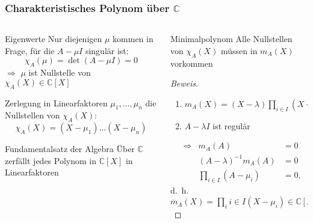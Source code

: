 %
%
%
\begin{frame}[t]
\setlength{\abovedisplayskip}{5pt}
\setlength{\belowdisplayskip}{5pt}
\frametitle{Charakteristisches Polynom über $\mathbb{C}$}
\vspace{-18pt}
\begin{columns}[t,onlytextwidth]
\begin{column}{0.48\textwidth}
\begin{block}{Eigenwerte}
Nur diejenigen $\mu$ kommen in Frage, für die
$A-\mu I$ singulär ist:
\[
\chi_{A}(\mu)
=
\det (A-\mu I) = 0
\]
$\Rightarrow$ $\mu$ ist Nullstelle von $\chi_{A}(X)\in\mathbb{C}[X]$
\end{block}
\begin{block}{Zerlegung in Linearfaktoren}
$\mu_1,\dots,\mu_n$ die Nullstellen von $\chi_A(X)$:
\[
\chi_A(X)
=
(X-\mu_1)\dots (X-\mu_n)
\]
\end{block}
\begin{block}{Fundamentalsatz der Algebra}
Über $\mathbb{C}$ zerfällt jedes Polynom in $\mathbb{C}[X]$ in
Linearfaktoren
\end{block}
\end{column}
\begin{column}{0.48\textwidth}
\begin{block}{Minimalpolynom}
Alle Nullstellen von $\chi_A(X)$ müssen in $m_A(X)$ vorkommen
\end{block}
\begin{proof}[Beweis]
\begin{enumerate}
\item
$m_A(X) = (X-\lambda) \prod_{i\in I}(X-\mu_i)$
\item
$A-\lambda I$ ist regulär
\end{enumerate}
\begin{align*}
&\Rightarrow&
m_A(A)&=0
\\
&&
(A-\lambda)^{-1}m_A(A) &=0
\\
&&
\prod_{i\in I}(A-\mu_i)&=0,
\end{align*}
d.~h.~\(
\displaystyle
\overline{m}_A(X)
=
\prod_i{i\in I}(X-\mu_i)
\in
\mathbb{C}[X]
\)
\end{proof}
\end{column}
\end{columns}
\end{frame}
